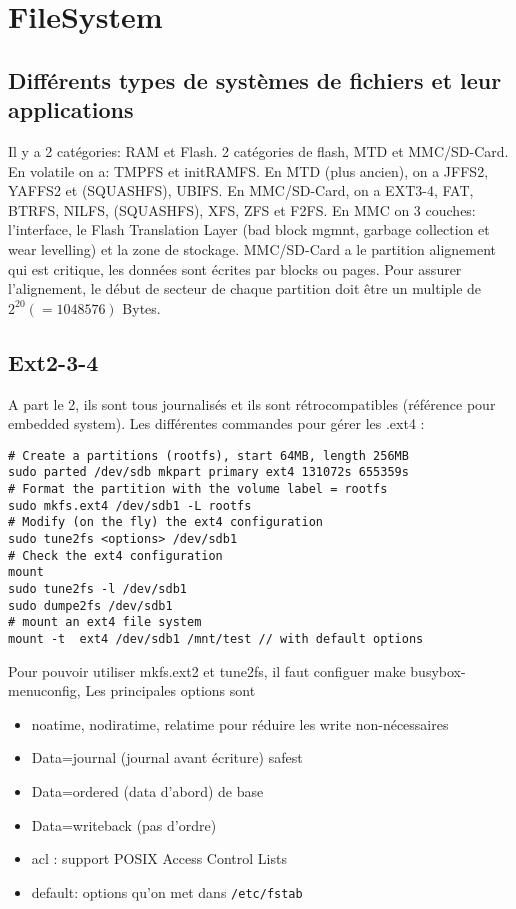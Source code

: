 \section{FileSystem}
\subsection{Différents types de systèmes de fichiers et leur applications}
Il y a 2 catégories: RAM et Flash. 2 catégories de flash, MTD et MMC/SD-Card.
En volatile on a: TMPFS et initRAMFS. En MTD (plus ancien), on a JFFS2, YAFFS2 et (SQUASHFS), UBIFS. En MMC/SD-Card, on a EXT3-4, FAT, BTRFS, NILFS, (SQUASHFS), XFS, ZFS et F2FS. En MMC on 3 couches: l'interface, le Flash Translation Layer (bad block mgmnt, garbage collection et wear levelling) et la zone de stockage. MMC/SD-Card a le partition alignement qui est critique, les données sont écrites par blocks ou pages. Pour assurer l'alignement, le début de secteur de chaque partition doit être un multiple de $2^20(=1048576)$ Bytes.
\subsection{Ext2-3-4}
A part le 2, ils sont tous journalisés et ils sont rétrocompatibles (référence pour embedded system). Les différentes commandes pour gérer les .ext4 :
\begin{lstlisting}[style=bash]
# Create a partitions (rootfs), start 64MB, length 256MB
sudo parted /dev/sdb mkpart primary ext4 131072s 655359s
# Format the partition with the volume label = rootfs
sudo mkfs.ext4 /dev/sdb1 -L rootfs
# Modify (on the fly) the ext4 configuration
sudo tune2fs <options> /dev/sdb1
# Check the ext4 configuration
mount
sudo tune2fs -l /dev/sdb1
sudo dumpe2fs /dev/sdb1
# mount an ext4 file system
mount -t  ext4 /dev/sdb1 /mnt/test // with default options
\end{lstlisting}
Pour pouvoir utiliser mkfs.ext2 et tune2fs, il faut configuer make busybox-menuconfig, Les principales options sont
\begin{itemize}
\item noatime, nodiratime, relatime pour réduire les write non-nécessaires
\item Data=journal (journal avant écriture) safest
\item Data=ordered (data d'abord) de base
\item Data=writeback (pas d'ordre)
\item acl : support POSIX Access Control Lists
\item default: options qu'on met dans \verb!/etc/fstab!
\end{itemize}
